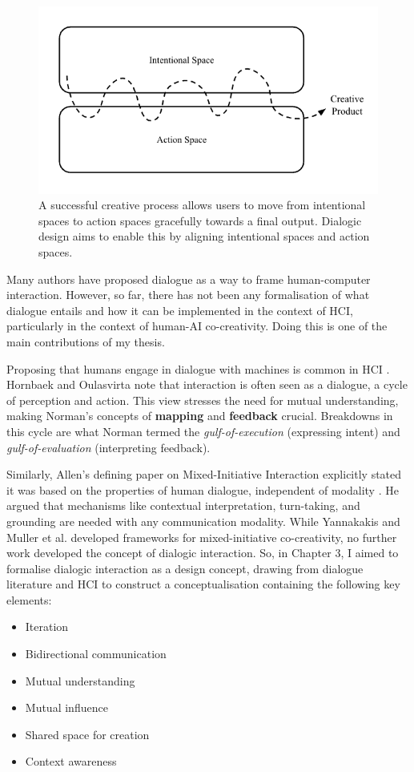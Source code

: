 \begin{figure}[H]
    \centering
    \includegraphics[width=1\linewidth]{alignedintention.png}
    \caption{A successful creative process allows users to move from intentional spaces to action spaces gracefully towards a final output. Dialogic design aims to enable this by aligning intentional spaces and action spaces.}
    \label{fig:aligned-intention}
\end{figure}

Many authors have proposed dialogue as a way to frame human-computer interaction. However, so far, there has not been any formalisation of what dialogue entails and how it can be implemented in the context of HCI, particularly in the context of human-AI co-creativity. Doing this is one of the main contributions of my thesis. 

 Proposing that humans engage in dialogue with machines is common in HCI \cite{Suchman2006-bs}. Hornbaek and Oulasvirta \cite{Hornbaek2017-wg} note that interaction is often seen as a dialogue, a cycle of perception and action. This view stresses the need for mutual understanding, making Norman’s concepts of \textbf{mapping} and \textbf{feedback} crucial. Breakdowns in this cycle are what Norman termed the \textit{gulf-of-execution} (expressing intent) and \textit{gulf-of-evaluation} (interpreting feedback).

Similarly, Allen's defining paper on Mixed-Initiative Interaction explicitly stated it was based on the properties of human dialogue, independent of modality \cite{Allen1999-sr}. He argued that mechanisms like contextual interpretation, turn-taking, and grounding are needed with any communication modality. While Yannakakis \cite{Yannakakis2014-zs} and Muller et al. \cite{Muller2020-nv} developed frameworks for mixed-initiative co-creativity, no further work developed the concept of dialogic interaction. So, in Chapter 3, I aimed to formalise dialogic interaction as a design concept, drawing from dialogue literature and HCI to construct a conceptualisation containing the following key elements:
\begin{itemize}
    \item Iteration
    \item Bidirectional communication
    \item Mutual understanding
    \item Mutual influence
    \item Shared space for creation
    \item Context awareness
\end{itemize}

